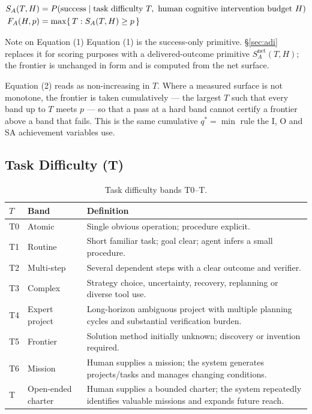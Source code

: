\begin{align}
\SA{} &= P(\text{success} \mid \text{task difficulty } T,\ \text{human cognitive intervention budget } H)\\
\FA{} &= \max\{\,T : \SA{} \ge p\,\}
\end{align}

\begin{addedbox}{Note on Equation (1)}
Equation (1) is the success-only primitive. \S\ref{sec:adi} replaces it for scoring purposes with a delivered-outcome primitive $S^{\text{net}}_A(T,H)$; the frontier \FA{} is unchanged in form and is computed from the net surface.

Equation (2) reads \SA{} as non-increasing in $T$. Where a measured surface is not monotone, the frontier is taken cumulatively --- the largest $T$ such that every band up to $T$ meets $p$ --- so that a pass at a hard band cannot certify a frontier above a band that fails. This is the same cumulative $q^{*}=\min$ rule the I, O and SA achievement variables use.
\end{addedbox}

\subsection{Task Difficulty (T)}

\begin{table}[!htbp]
\centering\small
\begin{tabularx}{\textwidth}{@{}llY@{}}
\toprule
$T$ & Band & Definition \\
\midrule
T0 & Atomic & Single obvious operation; procedure explicit. \\
T1 & Routine & Short familiar task; goal clear; agent infers a small procedure. \\
T2 & Multi-step & Several dependent steps with a clear outcome and verifier. \\
T3 & Complex & Strategy choice, uncertainty, recovery, replanning or diverse tool use. \\
T4 & Expert project & Long-horizon ambiguous project with multiple planning cycles and substantial verification burden. \\
T5 & Frontier & Solution method initially unknown; discovery or invention required. \\
T6 & Mission & Human supplies a mission; the system generates projects/tasks and manages changing conditions. \\
T\Om{} & Open-ended charter & Human supplies a bounded charter; the system repeatedly identifies valuable missions and expands future reach. \\
\bottomrule
\end{tabularx}
\caption{Task difficulty bands T0--T\Om{}.}
\label{tab:t}
\end{table}


